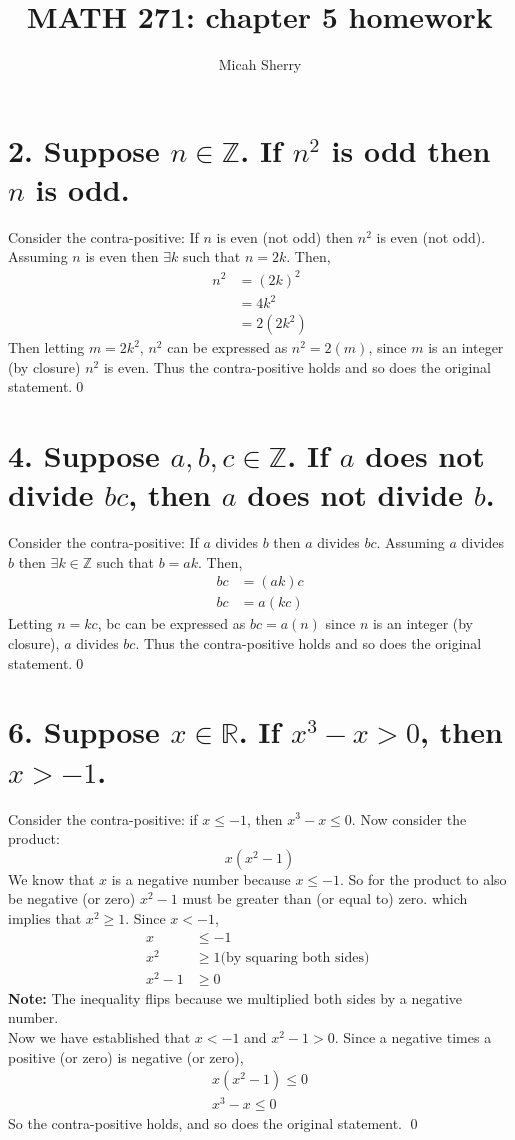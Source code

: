 \documentclass{article}
\title{MATH 271: chapter 5 homework}
\author{Micah Sherry}
\begin{document}
	\maketitle
	
	\section*{2. Suppose $n \in \mathbb{Z}$. If $n^2$ is odd then $n$ is odd. }
	Consider the contra-positive: If $n$ is even (not odd) then $n^2$ is even (not odd). Assuming $n$ is even then $\exists k $ such that $n = 2k$. Then, 
	\begin{align*}
		n^2 &= (2k)^2  \\
		&= 4k^2    \\
		&= 2(2k^2) 
	\end{align*}
	Then letting $m = 2k^2$, $n^2$ can be expressed as $n^2=2(m)$, since $m$ is an integer (by closure) $n^2$ is even.
	Thus the contra-positive holds and so does the original statement.\qed
	
	\section*{4. Suppose $a,b,c \in \mathbb{Z}$. If $a$ does not divide $bc$, then $a$ does not divide $b$.}	
	Consider the contra-positive: If $a$ divides $b$ then $a$ divides $bc$.
	Assuming $a$ divides $b$ then $ \exists k \in \mathbb{Z}$ such that $b = ak$. 
	Then, 
	\begin{align*}
		bc &= (ak)c \\
		bc &= a(kc) 	
	\end{align*}
	Letting $n = kc$, bc can be expressed as $bc= a(n)$ since $n$ is an integer (by closure), $a$ divides $bc$. Thus the contra-positive holds and so does the original statement.\qed
	
	
	\section*{6. Suppose $x \in \mathbb{R}$. If $x^3-x > 0$, then $x>-1$.}
	Consider the contra-positive: if $x \le -1$, then $x^3 - x \le 0 $. Now consider the product: $$x(x^2-1)$$ We know that $x$ is a negative number because $x \le -1$. So for the product to also be negative (or zero) $x^2-1$ must be greater than (or equal to) zero. which implies that $x^2 \ge 1$. Since $x<-1$,  
	\begin{align*}
		x &\le -1 \\
		x^2 &\ge 1 \text{(by squaring both sides) }\\
		x^2 -1 &\ge 0
	\end{align*}
	\textbf{Note:} The inequality flips because we multiplied both sides by a negative number. \\
	Now we have established that $x < -1$ and $x^2-1> 0$. Since a negative times a positive (or zero) is negative (or zero), 
	\begin{align*}
		x(x^2-1) \le 0\\
		x^3-x \le 0
	\end{align*}
	So the contra-positive holds, and so does the original statement. \qed
	
\end{document}
